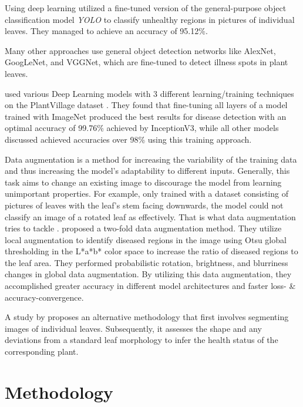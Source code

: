 \documentclass[draft,final]{vutinfth} %
\begin{document}
Using deep learning \cite{khalid_real-time_2023} utilized a fine-tuned version of the general-purpose object classification model \textit{YOLO} to classify unhealthy regions in pictures of individual leaves. They managed to achieve an accuracy of 95.12\%.

Many other approaches use general object detection networks like AlexNet, GoogLeNet, and VGGNet, which are fine-tuned to detect illness spots in plant leaves. \cite{applalanaidu_review_2021}

\cite{brahimi_deep_2018} used various Deep Learning models with 3 different learning/training techniques on the PlantVillage dataset \cite{hughes_open_2016}. They found that fine-tuning all layers of a model trained with ImageNet \cite{deng_imagenet_2009} produced the best results for disease detection with an optimal accuracy of 99.76\% achieved by InceptionV3, while all other models discussed achieved accuracies over 98\% using this training approach.

Data augmentation is a method for increasing the variability of the training data and thus increasing the model's adaptability to different inputs. Generally, this task aims to change an existing image to discourage the model from learning unimportant properties. For example, only trained with a dataset consisting of pictures of leaves with the leaf's stem facing downwards, the model could not classify an image of a rotated leaf as effectively. That is what data augmentation tries to tackle \cite{perez_effectiveness_2017}. \cite{wongbongkotpaisan_plant_2021} proposed a two-fold data augmentation method. They utilize local augmentation to identify diseased regions in the image using Otsu global thresholding in the L*a*b* color space to increase the ratio of diseased regions to the leaf area. They performed probabilistic rotation, brightness, and blurriness changes in global data augmentation. By utilizing this data augmentation, they accomplished greater accuracy in different model architectures and faster loss- \& accuracy-convergence.

A study by \cite{xu_research_2022} proposes an alternative methodology that first involves segmenting images of individual leaves. Subsequently, it assesses the shape and any deviations from a standard leaf morphology to infer the health status of the corresponding plant.

\chapter{Methodology}
\end{document}
